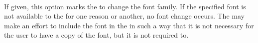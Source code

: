  \\

If given, this option marks the  to change the font family. If the specified font is not available to the  for one reason or another, no font change occurs. The  may make an effort to include the font in the  in such a way that it is not necessary for the user to have a copy of the font, but it is not required to. \\

\begin{examples}
\end{examples}

